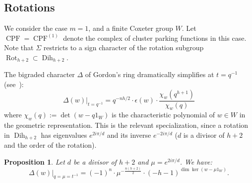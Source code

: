 \documentclass[11pt]{article}
\newtheorem{prop}[theo]{Proposition}
\theoremstyle{definition}
\newtheorem{defi}[theo]{Definition}
\DeclareMathOperator{\dih}{Dih}
\DeclareMathOperator{\rot}{Rot}
\DeclareMathOperator{\CPF}{CPF}
\begin{document}



\subsection{Rotations}
\label{sec:rotations}

We consider the case $m=1$, and a finite Coxeter group $W$.  Let $\CPF = \CPF^{(1)}$ denote the complex of cluster parking functions in this case.  Note that $\Sigma$ restricts to a sign character of the rotation subgroup $\rot_{h+2} \subset \dih_{h+2}$.

The bigraded character $\varDelta$ of Gordon's ring dramatically simplifies at $t=q^{-1}$ (see~\cite[Section~5]{gordon}): 
\begin{equation} \label{eq:spec_vardelta}
    \varDelta(w) \Big\vert_{t=q^{-1}}
        =
    q^{-nh/2} \cdot \epsilon(w) \cdot \frac{\chi_w(q^{h+1})}{\chi_w(q)}
\end{equation}
where $\chi_w(q) := \det(w-q1_W)$ is the characteristic polynomial of $w \in W$ in the geometric representation.  This is the relevant specialization, since a rotation in $\dih_{h+2}$ has eigenvalues $e^{2i\pi/d}$ and its inverse $e^{-2i\pi/d}$ ($d$ is a divisor of $h+2$ and the order of the rotation).

\begin{prop}
Let $d$ be a divisor of $h+2$ and $\mu = e^{2i\pi / d}$.  We have:
\begin{equation} \label{eq:spec_vardelta2}
    \varDelta(w) \Big\vert_{q= \mu =t^{-1}}
        =
    (-1)^n \cdot \mu^{-\frac{n(h+2)}{2}} \cdot (-h-1)^{\dim \ker( w - \mu 1_W) }.
\end{equation}
\end{prop}
\end{document}
